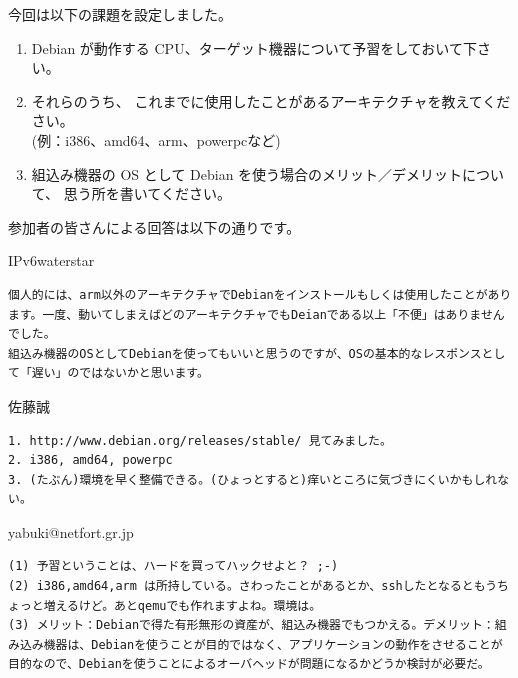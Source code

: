\documentclass[mingoth,a4paper]{jsarticle}
\begin{document}

今回は以下の課題を設定しました。
\begin{screen}
    \begin{enumerate}
          \item 
        Debian が動作する CPU、ターゲット機器について予習をしておいて下さい。
          \item 
        それらのうち、
        これまでに使用したことがあるアーキテクチャを教えてください。 \\
        (例：i386、amd64、arm、powerpcなど) 
          \item 
        組込み機器の OS として
        Debian を使う場合のメリット／デメリットについて、
        思う所を書いてください。 
    \end{enumerate}
\end{screen}

参加者の皆さんによる回答は以下の通りです。

\begin{prework}{ IPv6waterstar }
\begin{verbatim}
個人的には、arm以外のアーキテクチャでDebianをインストールもしくは使用したことがあります。一度、動いてしまえばどのアーキテクチャでもDeianである以上「不便」はありませんでした。
組込み機器のOSとしてDebianを使ってもいいと思うのですが、OSの基本的なレスポンスとして「遅い」のではないかと思います。
\end{verbatim}
\end{prework}

\begin{prework}{ 佐藤誠 }
\begin{verbatim}
1. http://www.debian.org/releases/stable/ 見てみました。
2. i386, amd64, powerpc
3. (たぶん)環境を早く整備できる。(ひょっとすると)痒いところに気づきにくいかもしれない。
\end{verbatim}

\end{prework}



\begin{prework}{ yabuki@netfort.gr.jp }

\begin{verbatim}
(1) 予習ということは、ハードを買ってハックせよと？ ;-)
(2) i386,amd64,arm は所持している。さわったことがあるとか、sshしたとなるともうちょっと増えるけど。あとqemuでも作れますよね。環境は。
(3) メリット：Debianで得た有形無形の資産が、組込み機器でもつかえる。デメリット：組み込み機器は、Debianを使うことが目的ではなく、アプリケーションの動作をさせることが目的なので、Debianを使うことによるオーバヘッドが問題になるかどうか検討が必要だ。
\end{verbatim}

\end{prework}
\end{document}
